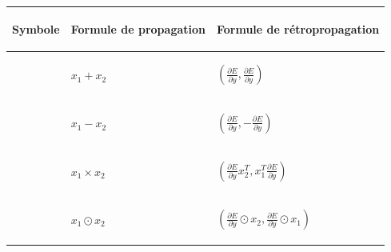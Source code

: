 \begin{center}
\begin{tabular}{|m{3.5cm}|m{2.9cm}|m{5.2cm}|}
\hline
\begin{center}Symbole\end{center} & \begin{center}Formule de propagation\end{center} & \begin{center}Formule de rétropropagation\end{center} \\
\hline
\begin{center}\end{center} & \begin{center}$x_1 + x_2$\end{center} & \begin{center}$(\frac{\partial E}{\partial y}, \frac{\partial E}{\partial y})$\end{center} \\
\hline
\begin{center}\end{center} & \begin{center}$x_1 - x_2$\end{center} & \begin{center}$(\frac{\partial E}{\partial y}, -\frac{\partial E}{\partial y})$\end{center} \\
\hline
\begin{center}\end{center} & \begin{center}$x_1 \times x_2$\end{center} & \begin{center}$(\frac{\partial E}{\partial y}x_2^T, x_1^T\frac{\partial E}{\partial y})$\end{center} \\
\hline
\begin{center}\end{center} & \begin{center}$x_1 \odot x_2$\end{center} & \begin{center}$(\frac{\partial E}{\partial y} \odot x_2, \frac{\partial E}{\partial y} \odot x_1)$\end{center} \\

\end{tabular}
\end{center}

